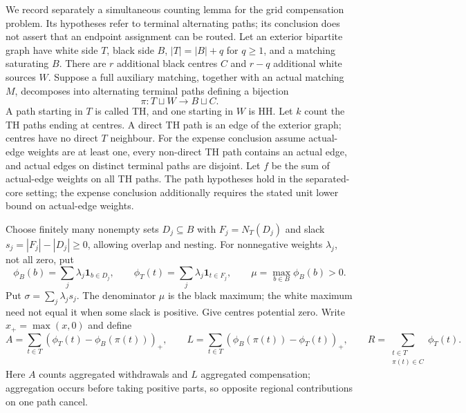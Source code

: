\documentclass[11pt]{article}
\begin{document}
We record separately a simultaneous counting lemma for the grid
compensation problem. Its hypotheses refer to terminal alternating paths;
its conclusion does not assert that an endpoint assignment can be routed.
Let an exterior bipartite graph have white side $T$, black side $B$,
$|T|=|B|+q$ for $q\ge1$, and a matching saturating $B$. There are $r$
additional black centres $C$ and $r-q$ additional white sources $W$.
Suppose a full auxiliary matching, together with an actual matching $M$,
decomposes into alternating terminal paths defining a bijection
\[
 \pi:T\sqcup W\longrightarrow B\sqcup C.
\]
A path starting in $T$ is called TH, and one starting in $W$ is HH.
Let $k$ count the TH paths ending at centres. A direct TH path is an
edge of the exterior graph; centres have no direct $T$ neighbour.
For the expense conclusion assume actual-edge weights are at least one,
every non-direct TH path contains an actual edge, and actual edges on
distinct terminal paths are disjoint. Let $f$ be the sum of actual-edge
weights on all TH paths. The path hypotheses hold in the separated-core
setting; the expense conclusion additionally requires the stated unit
lower bound on actual-edge weights.

Choose finitely many nonempty sets $D_j\subseteq B$ with
$F_j=N_T(D_j)$ and slack $s_j=|F_j|-|D_j|\ge0$, allowing overlap and nesting.
For nonnegative weights $\lambda_j$, not all zero, put
\[
 \phi_B(b)=\sum_j\lambda_j\mathbf1_{b\in D_j},\qquad
 \phi_T(t)=\sum_j\lambda_j\mathbf1_{t\in F_j},\qquad
 \mu=\max_{b\in B}\phi_B(b)>0.
\]
Put $\sigma=\sum_j\lambda_js_j$. The denominator $\mu$ is the black
maximum; the white maximum need not equal it when some slack is positive.
Give centres potential zero. Write $x_+=\max(x,0)$ and define
\[
 A=\sum_{t\in T}(\phi_T(t)-\phi_B(\pi(t)))_+,\qquad
 L=\sum_{t\in T}(\phi_B(\pi(t))-\phi_T(t))_+,\qquad
 R=\sum_{\substack{t\in T\\\pi(t)\in C}}\phi_T(t).
\]
Here $A$ counts aggregated withdrawals and $L$ aggregated compensation;
aggregation occurs before taking positive parts, so opposite regional
contributions on one path cancel.
\end{document}
